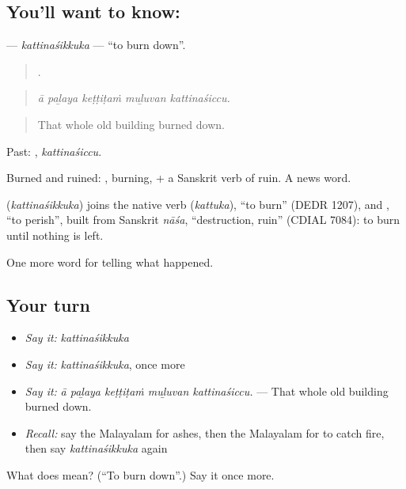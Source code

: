 \subsection*{You'll want to know: }
\textbf{} — \emph{kattinaśikkuka} — \textquotedblleft{}to burn down\textquotedblright{}.

\begin{quote}
    .
\end{quote}

\begin{quote}
\emph{ā paḻaya keṭṭiṭaṁ muḻuvan kattinaśiccu.}
\end{quote}

\begin{quote}
That whole old building burned down.
\end{quote}

Past: , \emph{kattinaśiccu}.

Burned and ruined: , burning, + a Sanskrit verb of ruin. A news word.

\begin{cousinweb}
\textbf{} (\emph{kattinaśikkuka}) joins the native verb  (\emph{kattuka}), \textquotedblleft{}to burn\textquotedblright{} (DEDR 1207), and , \textquotedblleft{}to perish\textquotedblright{}, built from Sanskrit \emph{nāśa}, \textquotedblleft{}destruction, ruin\textquotedblright{} (CDIAL 7084): to burn until nothing is left.
\end{cousinweb}

\begin{grammarlens}[title={What you've built}]
One more word for telling what happened.
\end{grammarlens}

\subsection*{Your turn}
\begin{itemize}
\raggedright
  \item \emph{Say it:} \emph{kattinaśikkuka}
  \item \emph{Say it:} \emph{kattinaśikkuka}, once more
  \item \emph{Say it:} \emph{ā paḻaya keṭṭiṭaṁ muḻuvan kattinaśiccu.} — That whole old building burned down.
  \item \emph{Recall:} say the Malayalam for ashes, then the Malayalam for to catch fire, then say \emph{kattinaśikkuka} again
\end{itemize}

\begin{tcolorbox}[breakable,colback=teal!4,colframe=teal!35!black,title={Before you move on}]
What does  mean? (\textquotedblleft{}To burn down\textquotedblright{}.) Say it once more.
\end{tcolorbox}
